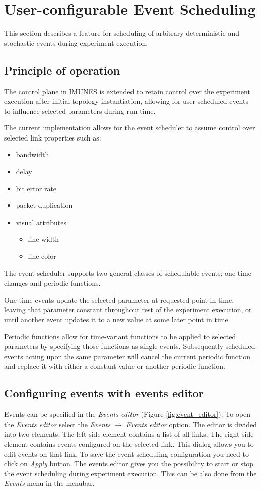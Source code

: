 \section{User-configurable Event Scheduling}
\label{sec:using event scheduler}
This section describes a feature for scheduling of arbitrary deterministic and
stochastic events during experiment execution.

\subsection{Principle of operation}
The control plane in IMUNES is extended to retain control over the experiment
execution after initial topology instantiation, allowing for user-scheduled
events to influence selected parameters during run time.

The current implementation allows for the event scheduler to assume control
over selected link properties such as:
\begin{itemize}
\item bandwidth
\item delay
\item bit error rate
\item packet duplication
\item visual attributes
\begin{itemize}
\item line width
\item line color
\end{itemize}
\end{itemize}

The event scheduler supports two general classes of schedulable events:
one-time changes and periodic functions. 

One-time events update the selected parameter at requested point in time,
leaving that parameter constant throughout rest of the experiment execution, or
until another event updates it to a new value at some later point in time. 

Periodic functions allow for time-variant functions to be applied to selected
parameters by specifying those functions as single events. Subsequently
scheduled events acting upon the same parameter will cancel the current
periodic function and replace it with either a constant value or another
periodic function.

\subsection{Configuring events with events editor}
Events can be specified in the \emph{Events editor} (Figure
\ref{fig:event_editor}). To open the \emph{Events editor} select the
\emph{Events} $\to$ \emph{Events editor} option. The editor is divided into two
elements. The left side element contains a list of all links. The right side
element contains events configured on the selected link. This dialog allows you
to edit events on that link. To save the event scheduling configuration you
need to click on \emph{Apply} button. The events editor gives you the
possibility to start or stop the event scheduling during experiment execution.
This can be also done from the \emph{Events} menu in the menubar.

